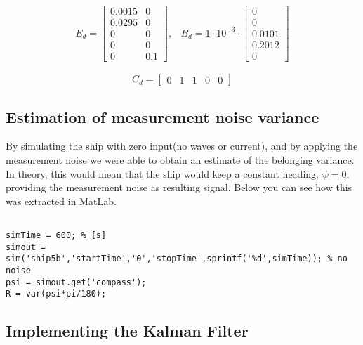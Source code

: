\begin{equation*}
    \begin{array}{cc}
       {E_d} = \left[ {\begin{array}{*{20}{c}}
{0.0015}&0\\
{0.0295}&0\\
0&0\\
0&0\\
0&{0.1}
\end{array}} \right]  ,&  
        {B_d} = 1 \cdot {10^{ - 3}} \cdot \left[ {\begin{array}{*{20}{c}}
0\\
0\\
{0.0101}\\
{0.2012}\\
0
\end{array}} \right]
    \end{array}
\end{equation*}

\begin{equation*}
    {C_d} = \left[ {\begin{array}{*{20}{c}}
0&1&1&0&0
\end{array}} \right]
\end{equation*}


\subsection{Estimation of measurement noise variance}

By simulating the ship with zero input(no waves or current), and by applying the measurement noise we were able to obtain an estimate of the belonging variance. In theory, this would mean that the ship would keep a constant heading, $\psi = 0$, providing the measurement noise as resulting signal. Below you can see how this was extracted in MatLab.


\begin{lstlisting}

simTime = 600; % [s]
simout = sim('ship5b','startTime','0','stopTime',sprintf('%d',simTime)); % no noise
psi = simout.get('compass'); 
R = var(psi*pi/180);    
\end{lstlisting}

\subsection{Implementing the Kalman Filter}

